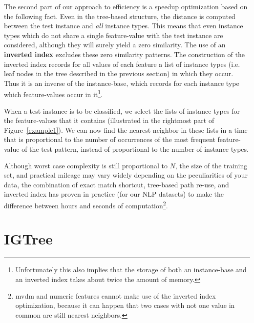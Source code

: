 \documentclass{report}
\begin{document}
The second part of our approach to efficiency is a speedup
optimization based on the following fact. Even in the tree-based
structure, the distance is computed between the test instance and {\em
all} instance types. This means that even instance types which do not
share a single feature-value with the test instance are considered,
although they will surely yield a zero similarity. The use of an {\bf
inverted index} excludes these zero similarity patterns.  The
construction of the inverted index records for all values of each
feature a list of instance types (i.e. leaf nodes in the tree
described in the previous section) in which they occur. Thus it is an
inverse of the instance-base, which records for each instance type
which feature-values occur in it\footnote{Unfortunately this also
implies that the storage of both an instance-base and an inverted
index takes about twice the amount of memory.}.

When a test instance is to be classified, we select the lists of
instance types for the feature-values that it contains (illustrated in
the rightmost part of Figure~\ref{example1}). We can now find the
nearest neighbor in these lists in a time that is proportional to the
number of occurrences of the most frequent feature-value of the test
pattern, instead of proportional to the number of instance types.

Although worst case complexity is still proportional to $N$, the size
of the training set, and practical mileage may vary widely depending
on the peculiarities of your data, the combination of exact match
shortcut, tree-based path re-use, and inverted index has proven in
practice (for our NLP datasets) to make the difference between hours
and seconds of computation\footnote{{\sc mvdm} and numeric features
cannot make use of the inverted index optimization, because it can
happen that two cases with not one value in common are still nearest
neighbors. 
%
}.

\section{IGTree}
\label{igtree}
\end{document}
